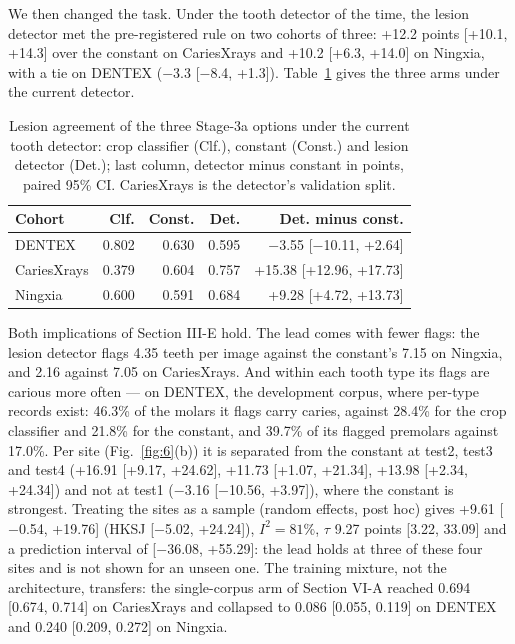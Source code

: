 \documentclass[conference]{IEEEtran}
\begin{document}
We then changed the task. Under the tooth detector of the time, the lesion detector met the pre-registered rule on two cohorts of three: +12.2 points [+10.1, +14.3] over the constant on CariesXrays and +10.2 [+6.3, +14.0] on Ningxia, with a tie on DENTEX ($-$3.3 [$-$8.4, +1.3]). Table~\ref{tab:6} gives the three arms under the current detector.

\begin{table}[t]
\centering
\caption{Lesion agreement of the three Stage-3a options under the current tooth detector: crop classifier (Clf.), constant (Const.) and lesion detector (Det.); last column, detector minus constant in points, paired 95\% CI. CariesXrays is the detector's validation split.}
\label{tab:6}
\footnotesize
\setlength{\tabcolsep}{3pt}
\begin{tabular}{>{\raggedright\arraybackslash}p{1.65cm}rrrr}
\toprule
Cohort & Clf. & Const. & Det. & Det. minus const. \\
\midrule
DENTEX & 0.802 & 0.630 & 0.595 & $-$3.55 [$-$10.11, +2.64] \\
CariesXrays & 0.379 & 0.604 & 0.757 & +15.38 [+12.96, +17.73] \\
Ningxia & 0.600 & 0.591 & 0.684 & +9.28 [+4.72, +13.73] \\
\bottomrule
\end{tabular}
\end{table}

Both implications of Section III-E hold. The lead comes with fewer flags: the lesion detector flags 4.35 teeth per image against the constant's 7.15 on Ningxia, and 2.16 against 7.05 on CariesXrays. And within each tooth type its flags are carious more often — on DENTEX, the development corpus, where per-type records exist: 46.3\% of the molars it flags carry caries, against 28.4\% for the crop classifier and 21.8\% for the constant, and 39.7\% of its flagged premolars against 17.0\%. Per site (Fig.~\ref{fig:6}(b)) it is separated from the constant at test2, test3 and test4 (+16.91 [+9.17, +24.62], +11.73 [+1.07, +21.34], +13.98 [+2.34, +24.34]) and not at test1 ($-$3.16 [$-$10.56, +3.97]), where the constant is strongest. Treating the sites as a sample (random effects, post hoc) gives +9.61 [$-$0.54, +19.76] (HKSJ [$-$5.02, +24.24]), $I^2 = 81\%$, $\tau$ 9.27 points [3.22, 33.09] and a prediction interval of [$-$36.08, +55.29]: the lead holds at three of these four sites and is not shown for an unseen one. The training mixture, not the architecture, transfers: the single-corpus arm of Section VI-A reached 0.694 [0.674, 0.714] on CariesXrays and collapsed to 0.086 [0.055, 0.119] on DENTEX and 0.240 [0.209, 0.272] on Ningxia.
\end{document}
